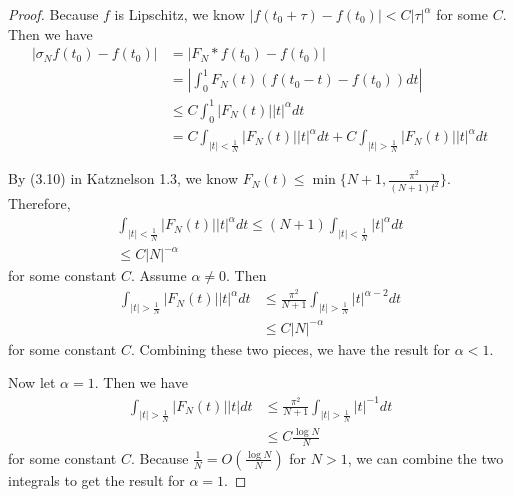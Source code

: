 \documentclass[a4paper]{article}
\begin{document}
\begin{enumerate}
\begin{proof}

  Because $f$ is Lipschitz, we know $|f(t_0 + \tau) -f(t_0)| < C |\tau|^\alpha$ for some $C$. Then we have
  \begin{align*}
    | \sigma_N f(t_0) - f(t_0) | &= \left| F_N \ast f(t_0) - f(t_0) \right| \\
    &= \left| \int_{0}^{1} F_N(t) \left( f(t_0 - t) - f(t_0) \right) dt \right| \\
    &\leq C \int_{0}^{1} | F_N(t) | |t|^\alpha dt \\
    &= C \int_{|t|< \frac{1}{N}}^{} |F_N(t)| |t|^\alpha dt + C \int_{|t|>\frac{1}{N}}^{} |F_N(t)| |t|^\alpha dt
  \end{align*}

  By (3.10) in Katznelson 1.3, we know $F_N(t) \leq \min \{ N+1, \frac{\pi^2}{(N+1)t^2} \}$. Therefore,
  \begin{align*}
    \int_{|t|<\frac{1}{N}}^{} |F_N(t)| |t|^\alpha dt \leq (N+1) \int_{|t|<\frac{1}{N}}^{} |t|^\alpha dt \\
    \leq C |N|^{-\alpha}
  \end{align*}
  for some constant $C$. Assume $\alpha \neq 0$. Then
  \begin{align*}
    \int_{|t|>\frac{1}{N}}^{} |F_N(t)||t|^\alpha dt &\leq \frac{\pi^2}{N+1} \int_{|t|>\frac{1}{N}}^{} |t|^{\alpha - 2} dt \\
    &\leq C |N|^{-\alpha}
  \end{align*}
  for some constant $C$. Combining these two pieces, we have the result for $\alpha < 1$.

  Now let $\alpha = 1$. Then we have
  \begin{align*}
    \int_{|t|>\frac{1}{N}}^{} |F_N(t)||t| dt &\leq \frac{\pi^2}{N+1} \int_{|t|>\frac{1}{N}}^{} |t|^{-1} dt \\
    &\leq C \frac{\log N}{N}
  \end{align*}
  for some constant $C$. Because $\frac{1}{N} = O \left( \frac{\log N}{N} \right)$ for $N>1$, we can combine the two integrals to get the result for
  $\alpha = 1$.

\end{proof}

\end{enumerate}
\end{document}
